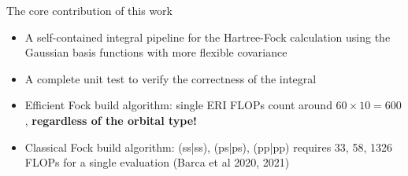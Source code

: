 \documentclass[aspectratio=169]{beamer}
\begin{document}
\begin{frame}{The core contribution of this work}
	\begin{itemize}
		\item A self-contained integral pipeline for the Hartree-Fock calculation
		using the Gaussian basis functions with more flexible covariance
		\item A complete unit test to verify the correctness of the integral
		\item Efficient Fock build algorithm: single ERI
		FLOPs count around $60 \times 10 = 600$, \textbf{regardless of the orbital type!}
		\item Classical Fock build algorithm: (ss|ss), (ps|ps), (pp|pp) requires 33, 58, 1326 FLOPs
		for a single evaluation (Barca et al 2020, 2021)
	\end{itemize}
\end{frame}
\end{document}

